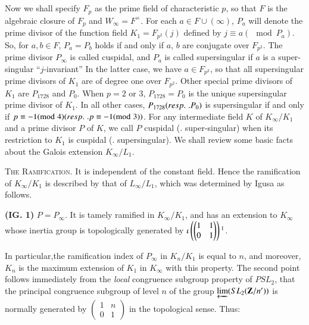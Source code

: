 \subsection{}\label{art6-sbusec1.2}
Now we shall specify $F_p$ as the prime field of characteristic $p$, so that $F$ is the algebraic closure of $F_p$ and $W_\infty = F^\times$. For each $a \in F \cup (\infty)$, $P_a$ will denote the prime divisor of the function field $K_1 = F_{p^2} (j)$ defined by $j \equiv a (\mod P_a)$. So, for $a, b \in F$, $P_a = P_b$ holds if and only if $a$, $b$ are conjugate over $F_{p^2}$. The prime divisor $P_\infty$ is called cuspidal, and $P_a$ is called supersingular if $a$ is a super-singular ``$j$-invariant'' In the latter case, we have $a \in F_{p^2}$, so that all supersingular prime divisors of $K_1$ are of degree one over $F_{p^2}$. Other special prime divisors of $K_1$ are $P_{1728}$ and $P_0$. When $p=2$ or 3, $P_{1728} = P_0$ is the unique supersingular prime divisor of $K_1$. In all other cases, $P_{1728}({resp.}\kern.3em. P_0)$  is supersingular if and only if $p \equiv -1 ({\rm{mod}}\kern.3em 4) ({resp.}\kern.3em. p \equiv -1 ({\rm{mod}}\kern.3em 3))$. For any intermediate field $K$ of $K_\infty/ K_1$ and a prime divisor $P$ of $K$, we call $P$ cuspidal (\resp. super-singular) when its restriction to $K_1$ is cuspidal (\resp. supersingular). We shall review some basic facts about the Galois extension $K_\infty/ L_1$.

\noindent
\textsc{The Ramification.} 
It is independent of the constant field. Hence the ramification of $K_\infty/ K_1$ is described by that of $L_\infty/ L_1$, which was determined by Igusa \cite{art6-key5} as follows.

\noindent
{\bf (IG. 1)} $P= P_\infty$. It is tamely ramified in $K_\infty / K_1$, and has an extension to $K_\infty$ whose inertia group is topologically generated by $\iota \left(\begin{pmatrix}
1&1\\
0&1
\end{pmatrix} \right)\footnote{This last point is not explicitly stated in \cite{art6-key5}, but follows easily from the arguments used there. See also \cite{art6-key8}, II, Ch. 5, \S 28 for an alternative proof.}$.

In particular,\pageoriginale the ramification index of $P_\infty$ in $K_n / K_1$ is equal to $n$, and moreover, $K_n$ is the maximum extension of $K_1$ in $K_\infty$ with this property. The second point follows immediately from the \textit{local} congruence subgroup property of $PSL_2$, that the principal congruence subgroup of level $n$ of the group $\underleftarrow{\lim} (SL_2 (\mathbf{Z}/n'))$ is normally generated by $\begin{pmatrix}
1 & n \\ 0 & 1\end{pmatrix}$ in the topological sense. Thus:

